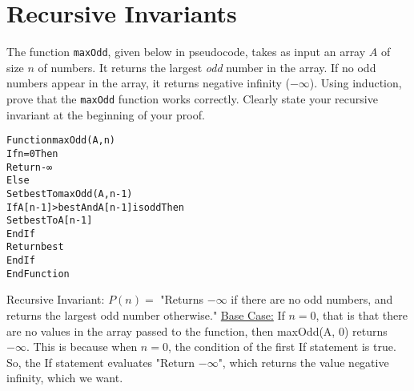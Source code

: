 \documentclass{article}
\begin{document}
    \vspace{1cm}
    \section{Recursive Invariants}
    
    The function \texttt{maxOdd}, given below in pseudocode, takes as input an array $A$ of size $n$ of numbers.  It returns the largest \emph{odd} number in the array.  If no odd numbers appear in the array, it returns negative infinity ($-\infty$).  Using induction, prove that the \texttt{maxOdd} function works correctly.  Clearly state your recursive invariant at the beginning of your proof.

    \begin{alltt}
Function maxOdd(A,n)
  If n = 0 Then
    Return -∞
  Else
    Set best To maxOdd(A,n-1)
    If A[n-1] > best And A[n-1] is odd Then
      Set best To A[n-1]
    EndIf
    Return best
  EndIf
EndFunction
    \end{alltt}

    Recursive Invariant: \newline
    $P(n) = $ "Returns $-\infty$ if there are no odd numbers, and returns
    the largest odd number otherwise." \newline
    \newline
    \noindent \underline{Base Case:} \newline
    If $n=0$, that is that there are no values in the array passed to 
    the function, then maxOdd(A, 0) returns $-\infty$. 
    This is because when $n=0$, the condition of the first If statement
    is true. So, the If statement evaluates "Return $-\infty$", which returns
    the value negative infinity, which we want. 
    \newline
\end{document}
